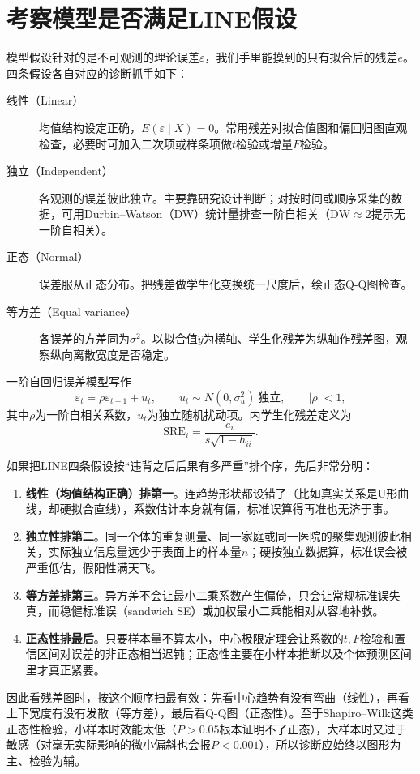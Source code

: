 \section{考察模型是否满足LINE假设}
模型假设针对的是不可观测的理论误差$\varepsilon$，我们手里能摸到的只有拟合后的残差$e$。四条假设各自对应的诊断抓手如下：
\begin{description}
\item[线性（Linear）] 均值结构设定正确，$E(\varepsilon\mid X)=0$。常用残差对拟合值图和偏回归图直观检查，必要时可加入二次项或样条项做$t$检验或增量$F$检验。
\item[独立（Independent）] 各观测的误差彼此独立。主要靠研究设计判断；对按时间或顺序采集的数据，可用Durbin--Watson（DW）统计量排查一阶自相关（$\mathrm{DW}\approx 2$提示无一阶自相关）。
\item[正态（Normal）] 误差服从正态分布。把残差做学生化变换统一尺度后，绘正态Q-Q图检查。
\item[等方差（Equal variance）] 各误差的方差同为$\sigma^2$。以拟合值$\widehat y$为横轴、学生化残差为纵轴作残差图，观察纵向离散宽度是否稳定。
\end{description}
一阶自回归误差模型写作
\[
\varepsilon_t=\rho\varepsilon_{t-1}+u_t,\qquad
u_t\sim N(0,\sigma_u^2)\ \text{独立},\qquad|\rho|<1,
\]
其中$\rho$为一阶自相关系数，$u_t$为独立随机扰动项。内学生化残差定义为
\[
\mathrm{SRE}_i=\frac{e_i}{s\sqrt{1-h_{ii}}}.
\]
\begin{sikao}
如果把LINE四条假设按“违背之后后果有多严重”排个序，先后非常分明：
\begin{enumerate}
\item \textbf{线性（均值结构正确）排第一}。连趋势形状都设错了（比如真实关系是U形曲线，却硬拟合直线），系数估计本身就有偏，标准误算得再准也无济于事。
\item \textbf{独立性排第二}。同一个体的重复测量、同一家庭或同一医院的聚集观测彼此相关，实际独立信息量远少于表面上的样本量$n$；硬按独立数据算，标准误会被严重低估，假阳性满天飞。
\item \textbf{等方差排第三}。异方差不会让最小二乘系数产生偏倚，只会让常规标准误失真，而稳健标准误（sandwich SE）或加权最小二乘能相对从容地补救。
\item \textbf{正态性排最后}。只要样本量不算太小，中心极限定理会让系数的$t,F$检验和置信区间对误差的非正态相当迟钝；正态性主要在小样本推断以及个体预测区间里才真正紧要。
\end{enumerate}
因此看残差图时，按这个顺序扫最有效：先看中心趋势有没有弯曲（线性），再看上下宽度有没有发散（等方差），最后看Q-Q图（正态性）。至于Shapiro--Wilk这类正态性检验，小样本时效能太低（$P>0.05$根本证明不了正态），大样本时又过于敏感（对毫无实际影响的微小偏斜也会报$P<0.001$），所以诊断应始终以图形为主、检验为辅。
\end{sikao}

